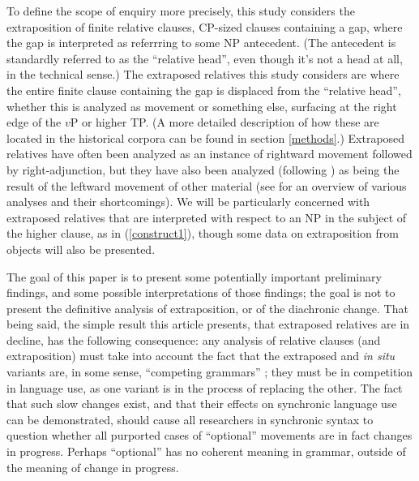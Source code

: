 To define the scope of enquiry more precisely, this study considers the extraposition of finite relative clauses, CP-sized clauses containing a gap, where the gap is interpreted as referrring to some NP antecedent. (The antecedent is standardly referred to as the ``relative head'', even though it's not a head at all, in the technical sense.) The extraposed relatives this study considers are where the entire finite clause containing the gap is displaced from the ``relative head'', whether this is analyzed as movement or something else, surfacing at the right edge of the $v$P or higher TP. (A more detailed description of how these are located in the historical corpora can be found in section \ref{methods}.) Extraposed relatives have often been analyzed as an instance of rightward movement followed by right-adjunction, but they have also been analyzed (following \citealt{kayne1994}) as being the result of the leftward movement of other material (see \citealt{baltin2006} for an overview of various analyses and their shortcomings). We will be particularly concerned with extraposed relatives that are interpreted with respect to an NP in the subject of the higher clause, as in (\ref{construct1}), though some data on extraposition from objects will also be presented.

The goal of this paper is to present some potentially important preliminary findings, and some possible interpretations of those findings; the goal is not to present the definitive analysis of extraposition, or of the diachronic change. That being said, the simple result this article presents, that extraposed relatives are in decline, has the following consequence: any analysis of relative clauses (and extraposition) must take into account the fact that the extraposed and \textsl{in situ} variants are, in some sense, ``competing grammars'' \citep[in the sense of][inter alia]{kroch1989, kroch1994}; they must be in competition in language use, as one variant is in the process of replacing the other.
The fact that such slow changes exist, and that their effects on synchronic language use can be demonstrated, should cause all researchers in synchronic syntax to question whether all purported cases of ``optional'' movements are in fact changes in progress.
Perhaps ``optional'' has no coherent meaning in grammar, outside of the meaning of change in progress.

